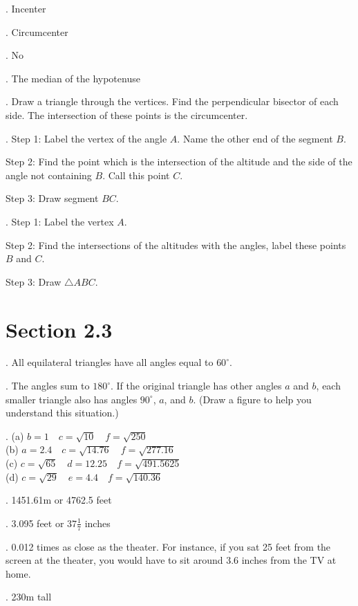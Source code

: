 .  Incenter

.  Circumcenter

.  No

.  The median of the hypotenuse

.  Draw a triangle through the vertices.  Find the perpendicular bisector of each side.  The intersection of these points is the circumcenter.

.  Step 1: Label the vertex of the angle $A$.  Name the other end of the segment $B$. 

Step 2: Find the point which is the intersection of the altitude and the side of the angle not containing $B$.  Call this point $C$. 

Step 3: Draw segment $BC$.


.  Step 1: Label the vertex $A$. 

Step 2: Find the intersections of the altitudes with the angles, label these points $B$ and $C$. 

Step 3: Draw $\triangle ABC$.


\section*{Section 2.3}

.  All equilateral triangles have all angles equal to $60^\circ$.

.  The angles sum to $180^\circ$.  If the original triangle has other angles $a$ and $b$, each smaller triangle also has angles $90^\circ$, $a$, and $b$.  (Draw a figure to help you understand this situation.)

.  (a) $b = 1 \quad c = \sqrt{10} \quad f = \sqrt{250}$ \\
(b) $a = 2.4 \quad c = \sqrt{14.76} \quad f = \sqrt{277.16}$ \\
(c) $c = \sqrt{65} \quad d = 12.25 \quad f = \sqrt{491.5625}$ \\
(d) $c = \sqrt{29} \quad e = 4.4 \quad f = \sqrt{140.36}$

.  1451.61m or 4762.5 feet

.  3.095 feet or $37 \frac17$ inches

.  0.012 times as close as the theater.  For instance, if you sat 25 feet from the screen at the theater, you would have to sit around 3.6 inches from the TV at home.

.  230m tall

